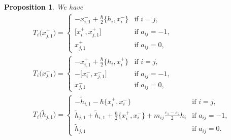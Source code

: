 \documentclass[pdftex]{sigma}
\newtheorem{prop}[thm]{Proposition}
\theoremstyle{definition}
\numberwithin{equation}{section}
\newcommand{\ve}{\varepsilon}
\begin{document}
\begin{prop}\label{prop:formula2}We have
\begin{gather*}
T_i\big(x_{j,1}^+\big) = \begin{cases}
-x_{i,1}^- + \tfrac{\hbar}{2}\big\{ h_i, x_i^- \big\} & \text{if $i=j$},\\
\big[x_i^+,x_{j,1}^+\big] & \text{if $a_{ij}=-1$},\\
x_{j,1}^+ & \text{if $a_{ij}=0$},
\end{cases} \\
T_i\big(x_{j,1}^-\big) = \begin{cases}
-x_{i,1}^+ + \tfrac{\hbar}{2}\big\{ h_i, x_i^+ \big\} & \text{if $i=j$},\\
-\big[x_{i}^-,x_{j,1}^-\big] & \text{if $a_{ij}=-1$},\\
x_{j,1}^- & \text{if $a_{ij}=0$},
\end{cases}
\\
T_i\big(\tilde{h}_{j,1}\big) = \begin{cases}
-\tilde{h}_{i,1} - \hbar \big\{ x_i^+,x_i^- \big\} & \text{if $i=j$},\\
\tilde{h}_{j,1} + \tilde{h}_{i,1} + \tfrac{\hbar}{2} \big\{ x_i^+,x_i^- \big\} + m_{ij}\tfrac{\ve_1 - \ve_2}{2} h_i & \text{if $a_{ij}=-1$},\\
\tilde{h}_{j,1} & \text{if $a_{ij}=0$}.
\end{cases}
\end{gather*}
\end{prop}
\end{document}
